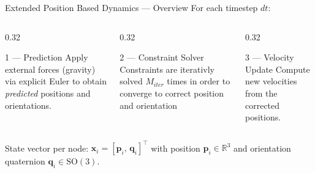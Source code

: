 \documentclass[aspectratio=169]{beamer}
\begin{document}
\begin{frame}{Extended Position Based Dynamics — Overview}
    For each timestep $dt$:
  \begin{center}
  \end{center}

  \vspace{0.5em}
  \begin{columns}[T]
    \begin{column}{0.32\textwidth}
      \begin{block}{1 — Prediction}
        Apply external forces (gravity) via explicit Euler to obtain \textit{predicted} positions and orientations.
      \end{block}
    \end{column}
    \begin{column}{0.32\textwidth}
      \begin{block}{2 — Constraint Solver}
        Constraints are iterativly solved $M_{iter}$ times in order to converge to correct position and orientation
      \end{block}
    \end{column}
    \begin{column}{0.32\textwidth}
      \begin{block}{3 — Velocity Update}
        Compute new velocities from the corrected positions.
      \end{block}
    \end{column}
  \end{columns}

  \vspace{0.6em}
  \small
  State vector per node: $\mathbf{x}_i = [\mathbf{p}_i,\, \mathbf{q}_i]^\top$
  with position $\mathbf{p}_i\in\mathbb{R}^3$ and orientation quaternion
  $\mathbf{q}_i\in\mathrm{SO}(3)$.
\end{frame}
\end{document}
